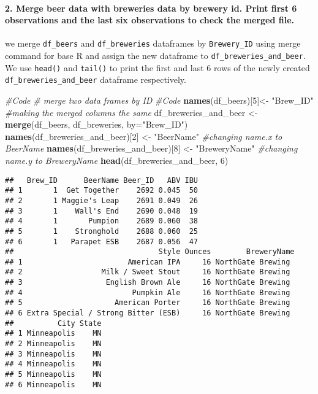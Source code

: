 \documentclass[]{article}
\newenvironment{Shaded}{\begin{snugshade}}{\end{snugshade}}
\newcommand{\CommentTok}[1]{\textcolor[rgb]{0.56,0.35,0.01}{\textit{#1}}}
\newcommand{\DataTypeTok}[1]{\textcolor[rgb]{0.13,0.29,0.53}{#1}}
\newcommand{\DecValTok}[1]{\textcolor[rgb]{0.00,0.00,0.81}{#1}}
\newcommand{\KeywordTok}[1]{\textcolor[rgb]{0.13,0.29,0.53}{\textbf{#1}}}
\newcommand{\NormalTok}[1]{#1}
\newcommand{\StringTok}[1]{\textcolor[rgb]{0.31,0.60,0.02}{#1}}
\let\oldparagraph\paragraph
\renewcommand{\paragraph}[1]{\oldparagraph{#1}\mbox{}}
\begin{document}
\hypertarget{merge-beer-data-with-breweries-data-by-brewery-id.-print-rst-6-observations-and-the-last-six-observations-to-check-the-merged-le.}{%
\paragraph{2. Merge beer data with breweries data by brewery id. Print
ﬁrst 6 observations and the last six observations to check the merged
ﬁle.}\label{merge-beer-data-with-breweries-data-by-brewery-id.-print-rst-6-observations-and-the-last-six-observations-to-check-the-merged-le.}}

we merge \texttt{df\_beers} and \texttt{df\_breweries} dataframes by
\texttt{Brewery\_ID} using merge command for base R and assign the new
dataframe to \texttt{df\_breweries\_and\_beer}. We use \texttt{head()}
and \texttt{tail()} to print the first and last 6 rows of the newly
created \texttt{df\_breweries\_and\_beer} dataframe respectively.

\begin{Shaded}
\begin{Highlighting}[]
\CommentTok{#Code}
\CommentTok{# merge two data frames by ID}
\CommentTok{#Code}
\KeywordTok{names}\NormalTok{(df_beers)[}\DecValTok{5}\NormalTok{]<-}\StringTok{ "Brew_ID"} \CommentTok{#making the merged columns the same}
\NormalTok{df_breweries_and_beer <-}\StringTok{ }\KeywordTok{merge}\NormalTok{(df_beers, df_breweries, }\DataTypeTok{by=}\StringTok{"Brew_ID"}\NormalTok{)}
\KeywordTok{names}\NormalTok{(df_breweries_and_beer)[}\DecValTok{2}\NormalTok{] <-}\StringTok{ "BeerName"} \CommentTok{#changing name.x to BeerName}
\KeywordTok{names}\NormalTok{(df_breweries_and_beer)[}\DecValTok{8}\NormalTok{] <-}\StringTok{ "BreweryName"} \CommentTok{#changing name.y to BreweryName}
\KeywordTok{head}\NormalTok{(df_breweries_and_beer, }\DecValTok{6}\NormalTok{)}
\end{Highlighting}
\end{Shaded}

\begin{verbatim}
##   Brew_ID      BeerName Beer_ID   ABV IBU
## 1       1  Get Together    2692 0.045  50
## 2       1 Maggie's Leap    2691 0.049  26
## 3       1    Wall's End    2690 0.048  19
## 4       1       Pumpion    2689 0.060  38
## 5       1    Stronghold    2688 0.060  25
## 6       1   Parapet ESB    2687 0.056  47
##                                 Style Ounces        BreweryName
## 1                        American IPA     16 NorthGate Brewing 
## 2                  Milk / Sweet Stout     16 NorthGate Brewing 
## 3                   English Brown Ale     16 NorthGate Brewing 
## 4                         Pumpkin Ale     16 NorthGate Brewing 
## 5                     American Porter     16 NorthGate Brewing 
## 6 Extra Special / Strong Bitter (ESB)     16 NorthGate Brewing 
##          City State
## 1 Minneapolis    MN
## 2 Minneapolis    MN
## 3 Minneapolis    MN
## 4 Minneapolis    MN
## 5 Minneapolis    MN
## 6 Minneapolis    MN
\end{verbatim}
\end{document}
